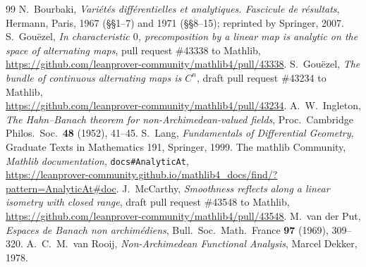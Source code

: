 \documentclass[11pt]{amsart}
\theoremstyle{remark}
\newcommand{\1}{\mathbf{1}}
\begin{document}
\begin{thebibliography}{99}
 N.~Bourbaki, \emph{Vari\'et\'es diff\'erentielles et analytiques. Fascicule de r\'esultats}, Hermann, Paris,
1967 (\S\S1--7) and 1971 (\S\S8--15); reprinted by Springer, 2007.
 S.~Gou\"ezel, \emph{In characteristic $0$, precomposition by a linear map is analytic on the space of
alternating maps}, pull request \#43338 to Mathlib,\\ {\small\url{https://github.com/leanprover-community/mathlib4/pull/43338}}.
 S.~Gou\"ezel, \emph{The bundle of continuous alternating maps is $C^n$}, draft pull request \#43234 to Mathlib,\\
{\small\url{https://github.com/leanprover-community/mathlib4/pull/43234}}.
 A.~W.~Ingleton, \emph{The Hahn--Banach theorem for non-Archimedean-valued fields}, Proc.\ Cambridge Philos.\
Soc.\ \textbf{48} (1952), 41--45.
 S.~Lang, \emph{Fundamentals of Differential Geometry}, Graduate Texts in Mathematics 191, Springer, 1999.
\bibitem{docs} The mathlib Community, \emph{Mathlib documentation}, \texttt{docs\#AnalyticAt},\\
{\small\url{https://leanprover-community.github.io/mathlib4_docs/find/?pattern=AnalyticAt#doc}}.
\bibitem{PR} J.~McCarthy, \emph{Smoothness reflects along a linear isometry with closed range}, draft pull request \#43548
to Mathlib,\\ {\small\url{https://github.com/leanprover-community/mathlib4/pull/43548}}.
\bibitem{vdP} M.~van der Put, \emph{Espaces de Banach non archim\'ediens}, Bull.\ Soc.\ Math.\ France \textbf{97} (1969), 309--320.
\bibitem{vR} A.~C.~M.~van Rooij, \emph{Non-Archimedean Functional Analysis}, Marcel Dekker, 1978.
\end{thebibliography}
\end{document}
